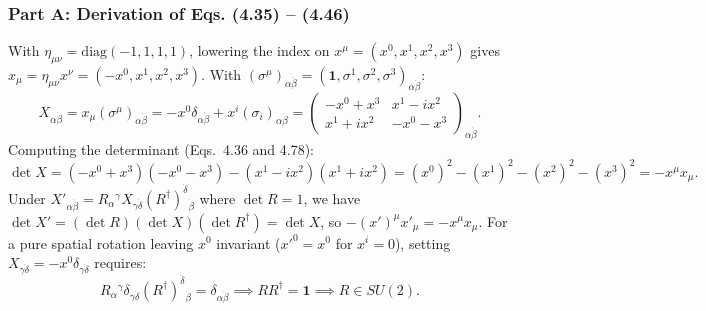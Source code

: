\documentclass[11pt,a4paper]{article}
\begin{document}
\subsubsection{Part A: Derivation of Eqs. (4.35) -- (4.46)}
With $\eta_{\mu\nu} = \mathrm{diag}(-1,1,1,1)$, lowering the index on $x^\mu = (x^0, x^1, x^2, x^3)$ gives $x_\mu = \eta_{\mu\nu}x^\nu = (-x^0, x^1, x^2, x^3)$. With $(\sigma^\mu)_{\alpha\dot{\beta}} = (\mathbf{1}, \sigma^1, \sigma^2, \sigma^3)_{\alpha\dot{\beta}}$:
\begin{equation}
    X_{\alpha\dot{\beta}} = x_\mu (\sigma^\mu)_{\alpha\dot{\beta}} = -x^0 \delta_{\alpha\dot{\beta}} + x^i (\sigma_i)_{\alpha\dot{\beta}} = \begin{pmatrix} -x^0 + x^3 & x^1 - ix^2 \\ x^1 + ix^2 & -x^0 - x^3 \end{pmatrix}_{\alpha\dot{\beta}}.
\end{equation}
Computing the determinant (Eqs.~4.36 and 4.78):
\begin{equation}
    \det X = (-x^0 + x^3)(-x^0 - x^3) - (x^1 - ix^2)(x^1 + ix^2) = (x^0)^2 - (x^1)^2 - (x^2)^2 - (x^3)^2 = -x^\mu x_\mu.
\end{equation}
Under $X'_{\alpha\dot{\beta}} = R_\alpha{}^\gamma X_{\gamma\dot{\delta}} (R^\dagger)^{\dot{\delta}}{}_{\dot{\beta}}$ where $\det R = 1$, we have $\det X' = (\det R)(\det X)(\det R^\dagger) = \det X$, so $-(x')^\mu x'_\mu = -x^\mu x_\mu$. For a pure spatial rotation leaving $x^0$ invariant ($x'^0 = x^0$ for $x^i = 0$), setting $X_{\gamma\dot{\delta}} = -x^0 \delta_{\gamma\dot{\delta}}$ requires:
\begin{equation}
    R_\alpha{}^\gamma \delta_{\gamma\dot{\delta}} (R^\dagger)^{\dot{\delta}}{}_{\dot{\beta}} = \delta_{\alpha\dot{\beta}} \implies R R^\dagger = \mathbf{1} \implies R \in SU(2).
\end{equation}
\end{document}

